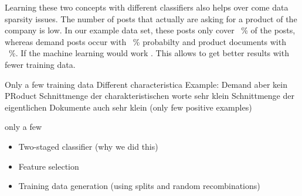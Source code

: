 Learning these two concepts with different classifiers also helps over come data sparsity issues.
The number of posts that actually are asking for a product of the company is low.
In our example data set, these posts only cover ~\% of the posts, whereas demand posts occur with ~\% probabilty and product documents with ~\%.
If the machine learning would work \cite{monard2002learning}.
This allows to get better results with fewer training data.

Only a few training data
Different characteristica
Example: Demand aber kein PRoduct
Schnittmenge der charakteristischen worte sehr klein
Schnittmenge der eigentlichen Dokumente auch sehr klein (only few positive examples)

only a few 

\begin{itemize}
	\item Two-staged classifier (why we did this)
	\item Feature selection
	\item Training data generation (using splits and random recombinations)
\end{itemize}


